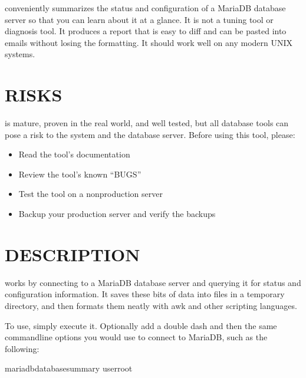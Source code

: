 \documentclass[letterpaper,10pt,english]{sphinxmanual}
\begin{document}
 conveniently summarizes the status and configuration of a
MariaDB database server so that you can learn about it at a glance.  It is not
a tuning tool or diagnosis tool.  It produces a report that is easy to diff
and can be pasted into emails without losing the formatting.  It should work
well on any modern UNIX systems.


\section{RISKS}
\label{\detokenize{mariadb-database-summary:risks}}
 is mature, proven in the real world, and well tested,
but all database tools can pose a risk to the system and the database
server.  Before using this tool, please:
\begin{itemize}
\item {} 
Read the tool’s documentation

\item {} 
Review the tool’s known “BUGS”

\item {} 
Test the tool on a non\sphinxhyphen{}production server

\item {} 
Backup your production server and verify the backups

\end{itemize}


\section{DESCRIPTION}
\label{\detokenize{mariadb-database-summary:description}}
 works by connecting to a MariaDB database server and querying
it for status and configuration information.  It saves these bits of data
into files in a temporary directory, and then formats them neatly with awk
and other scripting languages.

To use, simply execute it.  Optionally add a double dash and then the same
command\sphinxhyphen{}line options you would use to connect to MariaDB, such as the following:

\begin{sphinxVerbatim}[commandchars=\\\{\}]
mariadb\PYGZhy{}database\PYGZhy{}summary \PYGZhy{}\PYGZhy{}userroot
\end{sphinxVerbatim}
\end{document}
